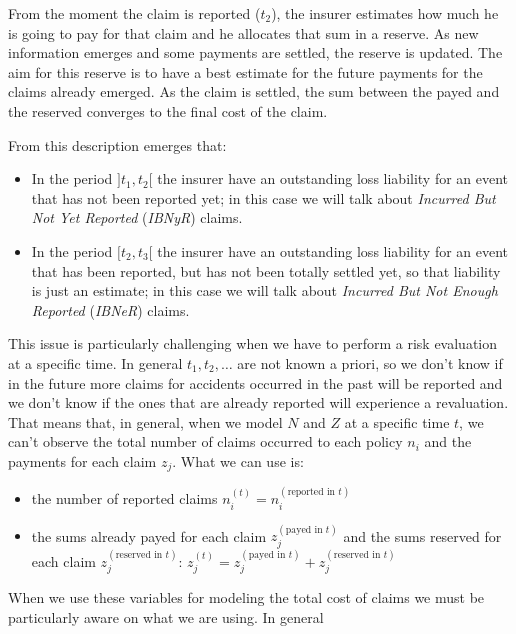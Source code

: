 \documentclass[a4paper, nobind]{templates/ociamthesis}
\providecommand{\tightlist}{%
  \setlength{\itemsep}{0pt}\setlength{\parskip}{0pt}}
\theoremstyle{definition}
\theoremstyle{definition}
\theoremstyle{definition}
\theoremstyle{remark}
\begin{document}
From the moment the claim is reported (\(t_2\)), the insurer estimates how much he is going to pay for that claim and he allocates that sum in a reserve. As new information emerges and some payments are settled, the reserve is updated. The aim for this reserve is to have a best estimate for the future payments for the claims already emerged. As the claim is settled, the sum between the payed and the reserved converges to the final cost of the claim.

From this description emerges that:

\begin{itemize}
\tightlist
\item
  In the period \(]t_1, t_2[\) the insurer have an outstanding loss liability for an event that has not been reported yet; in this case we will talk about \emph{Incurred But Not Yet Reported} (\emph{IBNyR}) claims.
\item
  In the period \([t_2, t_3[\) the insurer have an outstanding loss liability for an event that has been reported, but has not been totally settled yet, so that liability is just an estimate; in this case we will talk about \emph{Incurred But Not Enough Reported} (\emph{IBNeR}) claims.
\end{itemize}

This issue is particularly challenging when we have to perform a risk evaluation at a specific time. In general \(t_1, t_2,\dots\) are not known a priori, so we don't know if in the future more claims for accidents occurred in the past will be reported and we don't know if the ones that are already reported will experience a revaluation. That means that, in general, when we model \(N\) and \(Z\) at a specific time \(t\), we can't observe the total number of claims occurred to each policy \(n_i\) and the payments for each claim \(z_j\). What we can use is:

\begin{itemize}
\tightlist
\item
  the number of reported claims \(n_i^{(t)} = n_i^{(\text{reported in } t)}\)
\item
  the sums already payed for each claim \(z_j^{(\text{payed in }t)}\) and the sums reserved for each claim \(z_j^{(\text{reserved in } t)}\): \(z_j^{(t)} = z_j^{(\text{payed in }t)} + z_j^{(\text{reserved in } t)}\)
\end{itemize}

When we use these variables for modeling the total cost of claims we must be particularly aware on what we are using. In general
\end{document}
